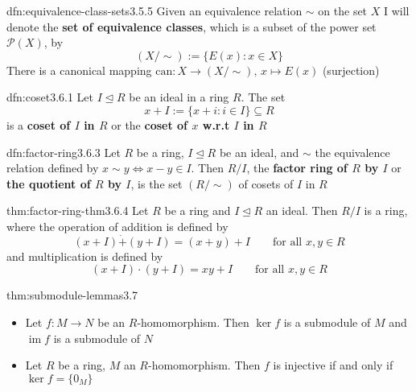 \documentclass[landscape, 8pt]{extarticle}
\DeclareMathOperator{\im}{im}
\begin{document}
\begin{multicols}{3}
\newpage
\begin{dfn}{dfn:equivalence-class-sets}{3.5.5}
    Given an equivalence relation $\sim$ on the set $X$ I will denote the \textbf{set of equivalence classes}, which is a subset of the power set $\mathcal{P}(X)$, by
    \[(X / \sim) := \{E(x) : x\in X\}\]
    There is a canonical mapping $\text{can}: X \to (X / \sim),\, x\mapsto E(x)$ (surjection)
\end{dfn}

\begin{dfn}[Coset]{dfn:coset}{3.6.1}
    Let $I \unlhd R$ be an ideal in a ring $R$. The set
    \[ x + I := \{x + i : i\in I\} \subseteq R\]
    is a \textbf{coset of $I$ in $R$} or the \textbf{coset of $x$ w.r.t $I$ in $R$}
\end{dfn}

\begin{dfn}{dfn:factor-ring}{3.6.3}
    Let $R$ be a ring, $I \unlhd R$ be an ideal, and $\sim$ the equivalence relation defined by $x \sim y \iff x - y \in I$. Then $R / I$, the \textbf{factor ring of $R$ by $I$} or \textbf{the quotient of $R$ by $I$}, is the set $(R / \sim)$ of cosets of $I$ in $R$
\end{dfn}

\begin{thm}[]{thm:factor-ring-thm}{3.6.4}
    Let $R$ be a ring and $I \unlhd R$ an ideal. Then $R / I$ is a ring, where the operation of addition is defined by
    \[(x + I) \dot{+} (y + I) = (x + y) + I \qquad \text{for all $x,y\in R$}\]
    and multiplication is defined by
    \[(x + I) \cdot (y + I) = xy + I \qquad \text{for all $x,y\in R$}\]
\end{thm}





\begin{thm}{thm:submodule-lemmas}{3.7}
    \begin{itemize}
        \setlength\itemsep{0em}
        \item[\textbf{3.7.21}] Let $f : M\to N$ be an $R$-homomorphism. Then $\ker f$ is a submodule of $M$ and $\im f$ is a submodule of $N$
        \item[\textbf{2.7.22}] Let $R$ be a ring, $M$ an $R$-homomorphism. Then $f$ is injective if and only if $\ker f = \{0_{M}\}$
    \end{itemize}
\end{thm}


\end{multicols}
\end{document}
